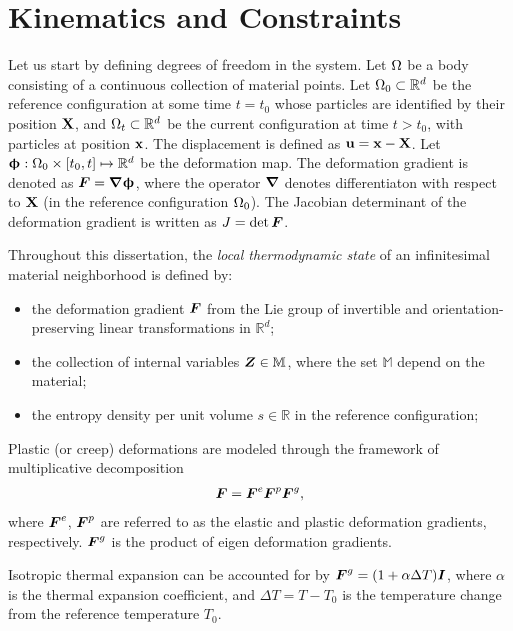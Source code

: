 \section{Kinematics and Constraints}
\label{section: Chapter2/kinematics}

Let us start by defining degrees of freedom in the system. Let $\Omega$ be a body consisting of a continuous collection of material points. Let $\Omega_0 \subset \mathbb{R}^d$ be the reference configuration at some time $t = t_0$ whose particles are identified by their position $\textbf{X}$, and $\Omega_t \subset \mathbb{R}^d$ be the current configuration at time $t > t_0$, with particles at position $\textbf{x}$. The displacement is defined as $\textbf{u} = \textbf{x} - \textbf{X}$.
Let $\boldsymbol{\upphi}: \Omega_0 \times [t_0, t] \mapsto \mathbb{R}^d$ be the deformation map.
The deformation gradient is denoted as $\boldsymbol{F} = \boldsymbol{\nabla} \boldsymbol{\upphi}$, where the operator $\boldsymbol{\nabla}$ denotes differentiaton with respect to $\textbf{X}$ (in the reference configuration $\Omega_0$). The Jacobian determinant of the deformation gradient is written as $J = \det\boldsymbol{F}$.

Throughout this dissertation, the \emph{local thermodynamic state} of an infinitesimal material neighborhood is defined by:
\begin{itemize}
  \item the deformation gradient $\boldsymbol{F}$ from the Lie group of invertible and orientation-preserving linear transformations in $\mathbb{R}^d$;
  \item the collection of internal variables $\boldsymbol{Z} \in \mathbb{M}$, where the set $\mathbb{M}$ depend on the material;
  \item the entropy density per unit volume $s \in \mathbb{R}$ in the reference configuration;
\end{itemize}

Plastic (or creep) deformations are modeled through the framework of multiplicative decomposition
\begin{align}
  \boldsymbol{F} = \boldsymbol{F}^e \boldsymbol{F}^p \boldsymbol{F}^g,
\end{align}
where $\boldsymbol{F}^e$, $\boldsymbol{F}^p$ are referred to as the elastic and plastic deformation gradients, respectively. $\boldsymbol{F}^g$ is the product of eigen deformation gradients.

\begin{example}
  Isotropic thermal expansion can be accounted for by $\boldsymbol{F}^g = (1+\alpha \Delta T)\boldsymbol{I}$, where $\alpha$ is the thermal expansion coefficient, and $\Delta T = T - T_0$ is the temperature change from the reference temperature $T_0$.
\end{example}


